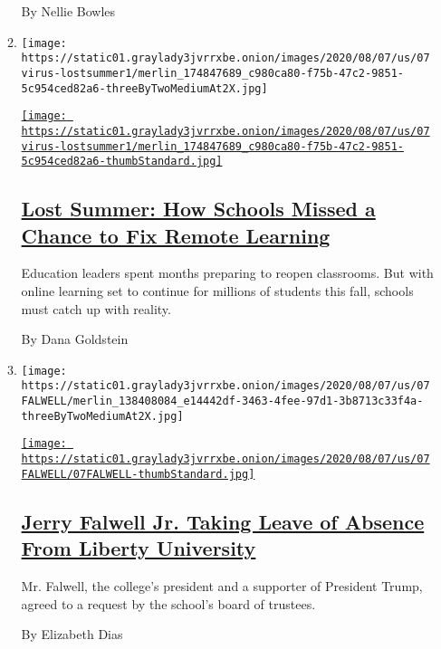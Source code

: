 \begin{enumerate}
\begin{enumerate}
    By Nellie Bowles
  \item
    \texttt{[image: https://static01.graylady3jvrrxbe.onion/images/2020/08/07/us/07virus-lostsummer1/merlin\_174847689\_c980ca80-f75b-47c2-9851-5c954ced82a6-threeByTwoMediumAt2X.jpg]}

    \href{/2020/08/07/us/remote-learning-fall-2020.html}{\texttt{[image: https://static01.graylady3jvrrxbe.onion/images/2020/08/07/us/07virus-lostsummer1/merlin\_174847689\_c980ca80-f75b-47c2-9851-5c954ced82a6-thumbStandard.jpg]}}

    \hypertarget{lost-summer-how-schools-missed-a-chance-to-fix-remote-learning}{%
    \subsection{\texorpdfstring{\href{/2020/08/07/us/remote-learning-fall-2020.html}{Lost
    Summer: How Schools Missed a Chance to Fix Remote
    Learning}}{Lost Summer: How Schools Missed a Chance to Fix Remote Learning}}\label{lost-summer-how-schools-missed-a-chance-to-fix-remote-learning}}

    Education leaders spent months preparing to reopen classrooms. But
    with online learning set to continue for millions of students this
    fall, schools must catch up with reality.

    By Dana Goldstein
  \item
    \texttt{[image: https://static01.graylady3jvrrxbe.onion/images/2020/08/07/us/07FALWELL/merlin\_138408084\_e14442df-3463-4fee-97d1-3b8713c33f4a-threeByTwoMediumAt2X.jpg]}

    \href{/2020/08/07/us/falwell-liberty.html}{\texttt{[image: https://static01.graylady3jvrrxbe.onion/images/2020/08/07/us/07FALWELL/07FALWELL-thumbStandard.jpg]}}

    \hypertarget{jerry-falwell-jr-taking-leave-of-absence-from-liberty-university}{%
    \subsection{\texorpdfstring{\href{/2020/08/07/us/falwell-liberty.html}{Jerry
    Falwell Jr. Taking Leave of Absence From Liberty
    University}}{Jerry Falwell Jr. Taking Leave of Absence From Liberty University}}\label{jerry-falwell-jr-taking-leave-of-absence-from-liberty-university}}

    Mr. Falwell, the college's president and a supporter of President
    Trump, agreed to a request by the school's board of trustees.

    By Elizabeth Dias
  \end{enumerate}
\end{enumerate}

